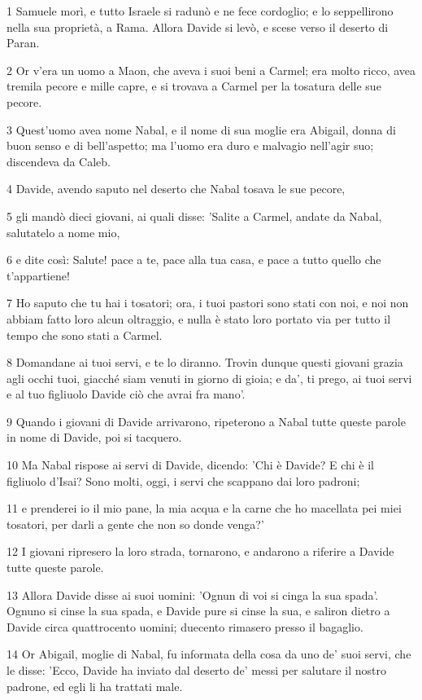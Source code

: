 \par 1 Samuele morì, e tutto Israele si radunò e ne fece cordoglio; e lo seppellirono nella sua proprietà, a Rama. Allora Davide si levò, e scese verso il deserto di Paran.
\par 2 Or v'era un uomo a Maon, che aveva i suoi beni a Carmel; era molto ricco, avea tremila pecore e mille capre, e si trovava a Carmel per la tosatura delle sue pecore.
\par 3 Quest'uomo avea nome Nabal, e il nome di sua moglie era Abigail, donna di buon senso e di bell'aspetto; ma l'uomo era duro e malvagio nell'agir suo; discendeva da Caleb.
\par 4 Davide, avendo saputo nel deserto che Nabal tosava le sue pecore,
\par 5 gli mandò dieci giovani, ai quali disse: 'Salite a Carmel, andate da Nabal, salutatelo a nome mio,
\par 6 e dite così: Salute! pace a te, pace alla tua casa, e pace a tutto quello che t'appartiene!
\par 7 Ho saputo che tu hai i tosatori; ora, i tuoi pastori sono stati con noi, e noi non abbiam fatto loro alcun oltraggio, e nulla è stato loro portato via per tutto il tempo che sono stati a Carmel.
\par 8 Domandane ai tuoi servi, e te lo diranno. Trovin dunque questi giovani grazia agli occhi tuoi, giacché siam venuti in giorno di gioia; e da', ti prego, ai tuoi servi e al tuo figliuolo Davide ciò che avrai fra mano'.
\par 9 Quando i giovani di Davide arrivarono, ripeterono a Nabal tutte queste parole in nome di Davide, poi si tacquero.
\par 10 Ma Nabal rispose ai servi di Davide, dicendo: 'Chi è Davide? E chi è il figliuolo d'Isai? Sono molti, oggi, i servi che scappano dai loro padroni;
\par 11 e prenderei io il mio pane, la mia acqua e la carne che ho macellata pei miei tosatori, per darli a gente che non so donde venga?'
\par 12 I giovani ripresero la loro strada, tornarono, e andarono a riferire a Davide tutte queste parole.
\par 13 Allora Davide disse ai suoi uomini: 'Ognun di voi si cinga la sua spada'. Ognuno si cinse la sua spada, e Davide pure si cinse la sua, e saliron dietro a Davide circa quattrocento uomini; duecento rimasero presso il bagaglio.
\par 14 Or Abigail, moglie di Nabal, fu informata della cosa da uno de' suoi servi, che le disse: 'Ecco, Davide ha inviato dal deserto de' messi per salutare il nostro padrone, ed egli li ha trattati male.
